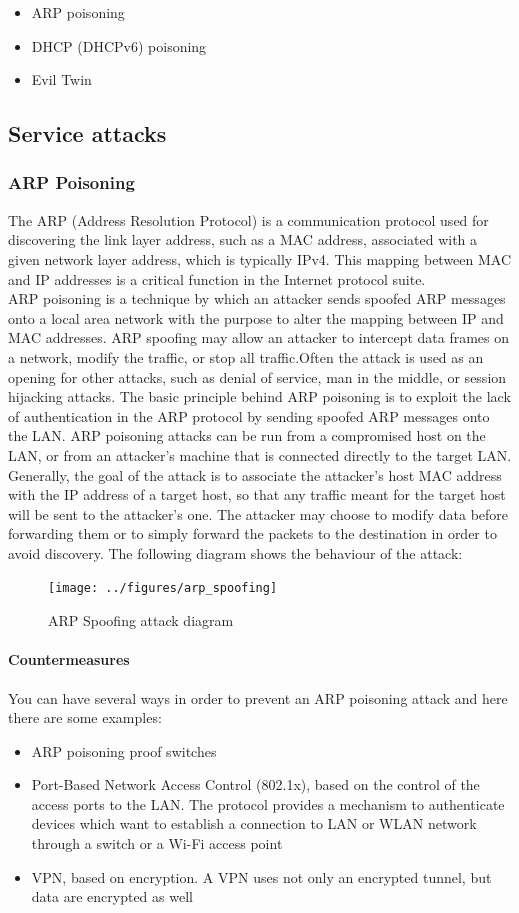 \documentclass{article}
\begin{document}
\begin{itemize}
  \item ARP poisoning
  \item DHCP (DHCPv6) poisoning
  \item Evil Twin
\end{itemize}

\subsection{Service attacks}
\subsubsection{ARP Poisoning}
The ARP (Address Resolution Protocol) is a communication protocol used for discovering the link layer address, such as a MAC address, associated with a given network layer address, which is typically IPv4. This mapping between MAC and IP addresses is a critical function in the Internet protocol suite. \\
ARP poisoning is a technique by which an attacker sends spoofed ARP messages onto a local area network with the purpose to alter the mapping between IP and MAC addresses. ARP spoofing may allow an attacker to intercept data frames on a network, modify the traffic, or stop all traffic.Often the attack is used as an opening for other attacks, such as denial of service, man in the middle, or session hijacking attacks. The basic principle behind ARP poisoning is to exploit the lack of authentication in the ARP protocol by sending spoofed ARP messages onto the LAN. ARP poisoning attacks can be run from a compromised host on the LAN, or from an attacker's machine that is connected directly to the target LAN.\\
Generally, the goal of the attack is to associate the attacker's host MAC address with the IP address of a target host, so that any traffic meant for the target host will be sent to the attacker's one. The attacker may choose to modify data before forwarding them or to simply forward the packets to the destination in order to avoid discovery. The following diagram shows the behaviour of the attack:
\begin{figure}[h]
  \center
  \texttt{[image: ../figures/arp\_spoofing]}
  \caption{ARP Spoofing attack diagram}
\end{figure}
\paragraph{Countermeasures}
You can have several ways in order to prevent an ARP poisoning attack and here there are some examples:
\begin{itemize}
  \item ARP poisoning proof switches
  \item Port-Based Network Access Control (802.1x), based on the control of the access ports to the LAN. The protocol provides a mechanism to authenticate devices which want to establish a connection to LAN or WLAN network through a switch or a Wi-Fi access point
  \item VPN, based on encryption. A VPN uses not only an encrypted tunnel, but data are encrypted as well
\end{itemize}
\end{document}
